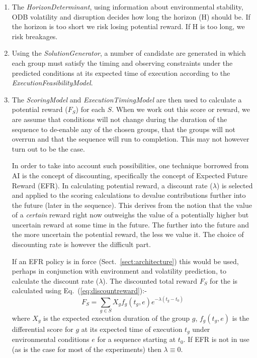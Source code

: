 \begin{enumerate}
\item The \emph{HorizonDeterminant}, using information about environmental stability, ODB volatility and disruption decides how long the \echelon horizon (H) should be. If the horizon is too short we risk losing potential reward. If H is too long, we risk breakages.

\item Using the \emph{SolutionGenerator}, a number of candidate \echelons are generated in which each group must satisfy the timing and observing constraints under the predicted conditions at its expected time of execution according to the \emph{ExecutionFeasibilityModel}.

\item The \emph{ScoringModel} and \emph{ExecutionTimingModel} are then used to calculate a potential reward ($F_S$) for each \echelon $S$. When we work out this score or reward, we are assume that conditions will not change during the duration of the sequence to de-enable any of the chosen groups, that the groups will not overrun and that the sequence will run to completion. This may not however turn out to be the case. 

In order to take into account such possibilities, one technique borrowed from AI is the concept of discounting, specifically the concept of Expected Future Reward (EFR). In calculating potential reward, a discount rate ($\lambda$) is selected and applied to the scoring calculations to devalue contributions further into the future (later in the sequence). This derives from the notion that the value of a \emph{certain} reward right now outweighs the value of a potentially higher but uncertain reward at some time in the future. The further into the future and the more uncertain the potential reward, the less we value it. The choice of discounting rate is however the difficult part. 

If an EFR policy  is in force (Sect.~\ref{sect:architecture}) this would be used, perhaps in conjunction with environment and volatility prediction, to calculate the discount rate ($\lambda$). The discounted total reward $F_S$ for the \echelon is calculated using Eq.~(\ref{eq:discountreward}):-
\begin{equation}
\label{eq:discountreward}
F_S = \sum_{g \in S}{X_g f_g(t_g,e)e^{-\lambda (t_g-t_0)}}
\end{equation}
where $X_g$ is the expected execution duration of the group $g$, $f_g(t_g,e)$ is the differential score for $g$ at its expected time of execution $t_g$ under environmental conditions $e$ for a sequence starting at $t_0$. If EFR is not in use (as is the case for most of the experiments) then $\lambda \equiv 0$.


\end{enumerate}

